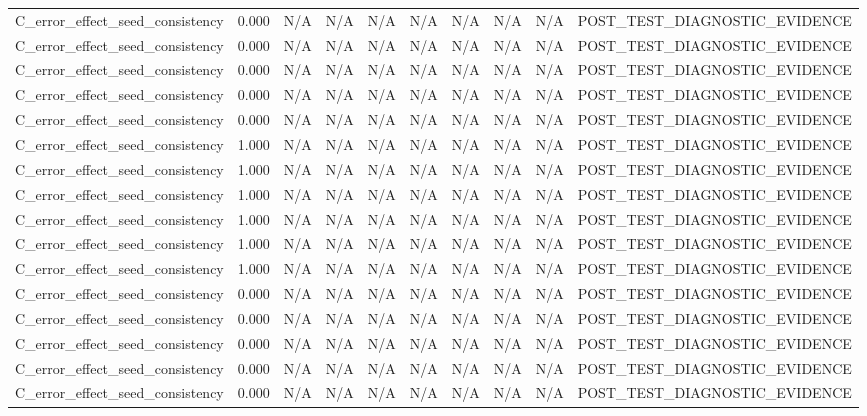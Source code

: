 \begin{table}[h!]
\begin{tabular}{lrrrrrrrrr}
C\_error\_effect\_seed\_consistency & 0.000 & N/A & N/A & N/A & N/A & N/A & N/A & N/A & POST\_TEST\_DIAGNOSTIC\_EVIDENCE \\
C\_error\_effect\_seed\_consistency & 0.000 & N/A & N/A & N/A & N/A & N/A & N/A & N/A & POST\_TEST\_DIAGNOSTIC\_EVIDENCE \\
C\_error\_effect\_seed\_consistency & 0.000 & N/A & N/A & N/A & N/A & N/A & N/A & N/A & POST\_TEST\_DIAGNOSTIC\_EVIDENCE \\
C\_error\_effect\_seed\_consistency & 0.000 & N/A & N/A & N/A & N/A & N/A & N/A & N/A & POST\_TEST\_DIAGNOSTIC\_EVIDENCE \\
C\_error\_effect\_seed\_consistency & 0.000 & N/A & N/A & N/A & N/A & N/A & N/A & N/A & POST\_TEST\_DIAGNOSTIC\_EVIDENCE \\
C\_error\_effect\_seed\_consistency & 1.000 & N/A & N/A & N/A & N/A & N/A & N/A & N/A & POST\_TEST\_DIAGNOSTIC\_EVIDENCE \\
C\_error\_effect\_seed\_consistency & 1.000 & N/A & N/A & N/A & N/A & N/A & N/A & N/A & POST\_TEST\_DIAGNOSTIC\_EVIDENCE \\
C\_error\_effect\_seed\_consistency & 1.000 & N/A & N/A & N/A & N/A & N/A & N/A & N/A & POST\_TEST\_DIAGNOSTIC\_EVIDENCE \\
C\_error\_effect\_seed\_consistency & 1.000 & N/A & N/A & N/A & N/A & N/A & N/A & N/A & POST\_TEST\_DIAGNOSTIC\_EVIDENCE \\
C\_error\_effect\_seed\_consistency & 1.000 & N/A & N/A & N/A & N/A & N/A & N/A & N/A & POST\_TEST\_DIAGNOSTIC\_EVIDENCE \\
C\_error\_effect\_seed\_consistency & 1.000 & N/A & N/A & N/A & N/A & N/A & N/A & N/A & POST\_TEST\_DIAGNOSTIC\_EVIDENCE \\
C\_error\_effect\_seed\_consistency & 0.000 & N/A & N/A & N/A & N/A & N/A & N/A & N/A & POST\_TEST\_DIAGNOSTIC\_EVIDENCE \\
C\_error\_effect\_seed\_consistency & 0.000 & N/A & N/A & N/A & N/A & N/A & N/A & N/A & POST\_TEST\_DIAGNOSTIC\_EVIDENCE \\
C\_error\_effect\_seed\_consistency & 0.000 & N/A & N/A & N/A & N/A & N/A & N/A & N/A & POST\_TEST\_DIAGNOSTIC\_EVIDENCE \\
C\_error\_effect\_seed\_consistency & 0.000 & N/A & N/A & N/A & N/A & N/A & N/A & N/A & POST\_TEST\_DIAGNOSTIC\_EVIDENCE \\
C\_error\_effect\_seed\_consistency & 0.000 & N/A & N/A & N/A & N/A & N/A & N/A & N/A & POST\_TEST\_DIAGNOSTIC\_EVIDENCE \\

\end{tabular}
\end{table}
